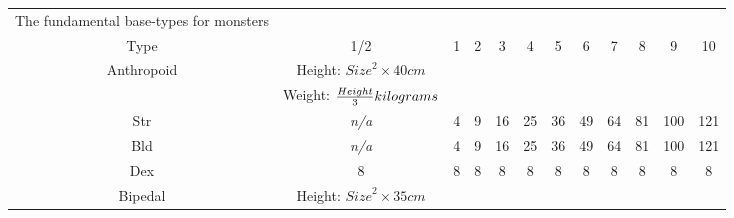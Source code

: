 \documentclass[twoside]{book}
\begin{document}
\begin{table}[htb]
  \begin{center}

  \begin{tabular}{|c|c|c|c|c|c|c|c|c|c|c|c|}
  \hline
\textscbf{}&\textscbf{}&\textscbf{}&\textscbf{}&\textscbf{}&\textscbf{}&\textscbf{}&\textscbf{}&\textscbf{}&\textscbf{}&\textscbf{}&\textscbf{}\\
  \hline
  \hline
      
                    The fundamental base-types for monsters
                  \\

\hline

 Type & 1/2 & 1 & 2 & 3 & 4 & 5 & 6 & 7 & 8 & 9 & 10 \\

\hline

 Anthropoid &  Height: \begin{math}    
                        {Size}^{ 2 }   \times     40 
                           cm    \end{math}
                  \\

\hline

&  Weight: \begin{math}    {{
                     Height}\over{ 3 }}  kilograms
                        \end{math}
                  \\

\hline

 Str &
                    \textit{n/a}
                  & 4 & 9 & 16 & 25 & 36 & 49 & 64 & 81 & 100 & 121 \\

\hline

 Bld &
                    \textit{n/a}
                  & 4 & 9 & 16 & 25 & 36 & 49 & 64 & 81 & 100 & 121 \\

\hline

 Dex & 8 & 8 & 8 & 8 & 8 & 8 & 8 & 8 & 8 & 8 & 8 \\

\hline

 Bipedal &  Height: \begin{math}    
                        {Size}^{ 2 }   \times   35 cm
                              \end{math}
                  \\

\hline


\end{tabular}
\end{center}
\end{table}
\end{document}
